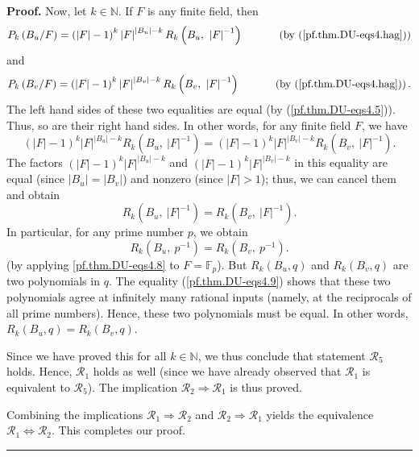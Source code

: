 \documentclass[numbers=enddot,12pt,final,onecolumn,notitlepage]{scrartcl}%
\theoremstyle{definition}
\newenvironment{proof}[1][Proof]{\noindent\textbf{#1.} }{\ \rule{0.5em}{0.5em}}
\newcommand{\NN}{\mathbb{N}}
\newenvironment{verlong}{}{}
\begin{document}
\begin{verlong}
\begin{proof}
Now, let $k\in\NN$. If $F$ is any finite field, then%
\[
P_{k}\left(  B_{u}/F\right)  =\left(  \left\vert F\right\vert -1\right)
^{k}\left\vert F\right\vert ^{\left\vert B_{u}\right\vert -k}R_{k}\left(
B_{u},\ \left\vert F\right\vert ^{-1}\right)  \ \ \ \ \ \ \ \ \ \ \left(
\text{by (\ref{pf.thm.DU-eqs4.hag})}\right)
\]
and%
\[
P_{k}\left(  B_{v}/F\right)  =\left(  \left\vert F\right\vert -1\right)
^{k}\left\vert F\right\vert ^{\left\vert B_{v}\right\vert -k}R_{k}\left(
B_{v},\ \left\vert F\right\vert ^{-1}\right)  \ \ \ \ \ \ \ \ \ \ \left(
\text{by (\ref{pf.thm.DU-eqs4.hag})}\right)  .
\]
The left hand sides of these two equalities are equal (by
(\ref{pf.thm.DU-eqs4.5})). Thus, so are their right hand sides. In other
words, for any finite field $F$, we have%
\[
\left(  \left\vert F\right\vert -1\right)  ^{k}\left\vert F\right\vert
^{\left\vert B_{u}\right\vert -k}R_{k}\left(  B_{u},\ \left\vert F\right\vert
^{-1}\right)  =\left(  \left\vert F\right\vert -1\right)  ^{k}\left\vert
F\right\vert ^{\left\vert B_{v}\right\vert -k}R_{k}\left(  B_{v},\ \left\vert
F\right\vert ^{-1}\right)  .
\]
The factors $\left(  \left\vert F\right\vert -1\right)  ^{k}\left\vert
F\right\vert ^{\left\vert B_{u}\right\vert -k}$ and $\left(  \left\vert
F\right\vert -1\right)  ^{k}\left\vert F\right\vert ^{\left\vert
B_{v}\right\vert -k}$ in this equality are equal (since $\left\vert
B_{u}\right\vert =\left\vert B_{v}\right\vert $) and nonzero (since
$\left\vert F\right\vert >1$); thus, we can cancel them and obtain
\begin{equation}
R_{k}\left(  B_{u},\ \left\vert F\right\vert ^{-1}\right)  =R_{k}\left(
B_{v},\ \left\vert F\right\vert ^{-1}\right)  .\label{pf.thm.DU-eqs4.8}%
\end{equation}
In particular, for any prime number $p$, we obtain
\begin{equation}
R_{k}\left(  B_{u},\ p^{-1}\right)  =R_{k}\left(
B_{v},\ p^{-1}\right)  .\label{pf.thm.DU-eqs4.9}
\end{equation}
(by applying \eqref{pf.thm.DU-eqs4.8} to $F = \mathbb{F}_p$).
But $R_{k}\left(  B_{u},q\right)  $ and $R_{k}\left(  B_{v},q\right)  $ are
two polynomials in $q$. The equality (\ref{pf.thm.DU-eqs4.9}) shows that these
two polynomials agree at infinitely many rational inputs (namely, at the reciprocals of all prime numbers). Hence, these two
polynomials must be equal. In other words, $R_{k}\left(  B_{u},q\right)
=R_{k}\left(  B_{v},q\right)  $.

Since we have proved this for all $k\in\NN$, we thus conclude that
statement $\mathcal{R}_5$ holds. Hence, $\mathcal{R}_1$ holds as well
(since we have already observed that $\mathcal{R}_1$ is equivalent to
$\mathcal{R}_5$). The implication $\mathcal{R}_2\Longrightarrow
\mathcal{R}_1$ is thus proved.

Combining the implications $\mathcal{R}_1\Longrightarrow\mathcal{R}_2$
and $\mathcal{R}_2\Longrightarrow\mathcal{R}_1$ yields the equivalence
$\mathcal{R}_1\Longleftrightarrow\mathcal{R}_2$. This completes our proof.
\end{proof}
\end{verlong}
\end{document}
